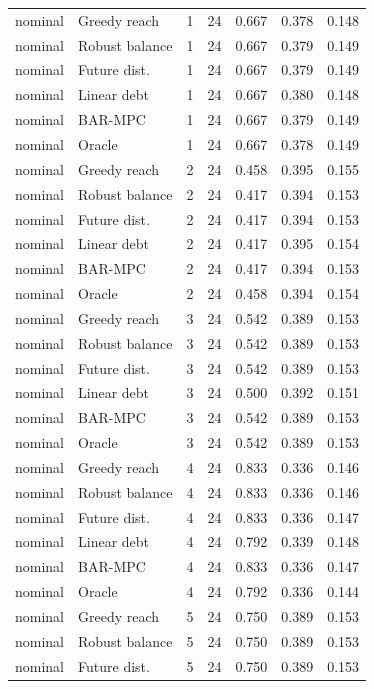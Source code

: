 \begin{longtable}{llrrrrr}
nominal & Greedy reach & 1 & 24 & 0.667 & 0.378 & 0.148 \\
nominal & Robust balance & 1 & 24 & 0.667 & 0.379 & 0.149 \\
nominal & Future dist. & 1 & 24 & 0.667 & 0.379 & 0.149 \\
nominal & Linear debt & 1 & 24 & 0.667 & 0.380 & 0.148 \\
nominal & BAR-MPC & 1 & 24 & 0.667 & 0.379 & 0.149 \\
nominal & Oracle & 1 & 24 & 0.667 & 0.378 & 0.149 \\
nominal & Greedy reach & 2 & 24 & 0.458 & 0.395 & 0.155 \\
nominal & Robust balance & 2 & 24 & 0.417 & 0.394 & 0.153 \\
nominal & Future dist. & 2 & 24 & 0.417 & 0.394 & 0.153 \\
nominal & Linear debt & 2 & 24 & 0.417 & 0.395 & 0.154 \\
nominal & BAR-MPC & 2 & 24 & 0.417 & 0.394 & 0.153 \\
nominal & Oracle & 2 & 24 & 0.458 & 0.394 & 0.154 \\
nominal & Greedy reach & 3 & 24 & 0.542 & 0.389 & 0.153 \\
nominal & Robust balance & 3 & 24 & 0.542 & 0.389 & 0.153 \\
nominal & Future dist. & 3 & 24 & 0.542 & 0.389 & 0.153 \\
nominal & Linear debt & 3 & 24 & 0.500 & 0.392 & 0.151 \\
nominal & BAR-MPC & 3 & 24 & 0.542 & 0.389 & 0.153 \\
nominal & Oracle & 3 & 24 & 0.542 & 0.389 & 0.153 \\
nominal & Greedy reach & 4 & 24 & 0.833 & 0.336 & 0.146 \\
nominal & Robust balance & 4 & 24 & 0.833 & 0.336 & 0.146 \\
nominal & Future dist. & 4 & 24 & 0.833 & 0.336 & 0.147 \\
nominal & Linear debt & 4 & 24 & 0.792 & 0.339 & 0.148 \\
nominal & BAR-MPC & 4 & 24 & 0.833 & 0.336 & 0.147 \\
nominal & Oracle & 4 & 24 & 0.792 & 0.336 & 0.144 \\
nominal & Greedy reach & 5 & 24 & 0.750 & 0.389 & 0.153 \\
nominal & Robust balance & 5 & 24 & 0.750 & 0.389 & 0.153 \\
nominal & Future dist. & 5 & 24 & 0.750 & 0.389 & 0.153 \\

\end{longtable}
